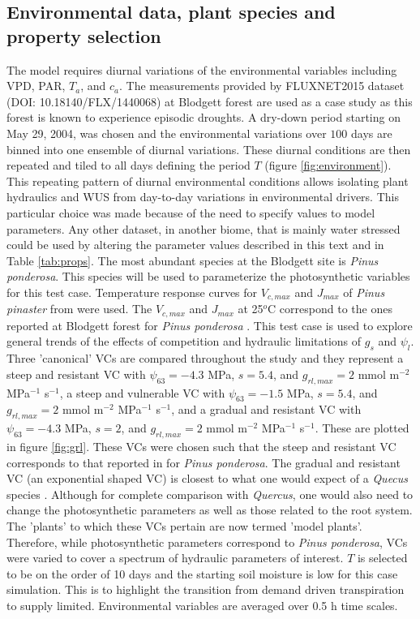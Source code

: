 \documentclass[utf8]{frontiersSCNS} %
\begin{document}
\subsection{Environmental data, plant species and property selection}

The model requires diurnal variations of the environmental variables including VPD, PAR, $T_a$, and $c_a$. The measurements provided by FLUXNET2015 dataset (DOI: 10.18140/FLX/1440068) at Blodgett forest are used as a case study as this forest is known to experience episodic droughts. A dry-down period starting on May 29, 2004, was chosen and the environmental variations over $100$ days are binned into one ensemble of diurnal variations. These diurnal conditions are then repeated and tiled to all days defining the period $T$ (figure \ref{fig:environment}). This repeating pattern of diurnal environmental conditions allows isolating plant hydraulics and WUS from day-to-day variations in environmental drivers. This particular choice was made because of the need to specify values to model parameters. Any other dataset, in another biome, that is mainly water stressed could be used by altering the parameter values described in this text and in Table \ref{tab:props}. The most abundant species at the Blodgett site is \textit{Pinus ponderosa}. This species will be used to parameterize the photosynthetic variables for this test case. Temperature response curves for $V_{c,max}$ and $J_{max}$ of \textit{Pinus pinaster} from \citep{medlyn_temperature_2002} were used.  The $V_{c,max}$ and $J_{max}$ at 25$^o$C  correspond to the ones reported at Blodgett forest for \textit{Pinus ponderosa} \citep{panek2004ozone}. This test case is used to explore general trends of the effects of competition and hydraulic limitations of $g_s$ and $\psi_l$. Three 'canonical' VCs are compared throughout the study and they represent a steep and resistant VC with $\psi_{63} = -4.3$ MPa, $s=5.4$, and $g_{rl,max} = 2$ mmol m$^{-2}$ MPa$^{-1}$ s$^{-1}$, a steep and vulnerable VC with $\psi_{63} = -1.5$ MPa, $s=5.4$, and $g_{rl,max} = 2$ mmol m$^{-2}$ MPa$^{-1}$ s$^{-1}$, and a gradual and resistant VC with $\psi_{63} = -4.3$ MPa, $s=2$, and $g_{rl,max} = 2$ mmol m$^{-2}$ MPa$^{-1}$ s$^{-1}$. These are plotted in figure \ref{fig:grl}. These VCs were chosen such that the steep and resistant VC corresponds to that reported in \citet{hubbard2001stomatal} for \textit{Pinus ponderosa}. The gradual and resistant VC (an exponential shaped VC) is closest to what one would expect of a \textit{Quecus} species \citep{christman_2012}. Although for complete comparison with \textit{Quercus}, one would also need to change the photosynthetic parameters as well as those related to the root system. The 'plants' to which these VCs pertain are now termed 'model plants'. Therefore, while photosynthetic parameters correspond to \textit{Pinus ponderosa}, VCs were varied to cover a spectrum of hydraulic parameters of interest. $T$ is selected to be on the order of 10 days and the starting soil moisture is low for this case simulation. This is to highlight the transition from demand driven transpiration to supply limited. Environmental variables are averaged over 0.5 h time scales.
\end{document}
